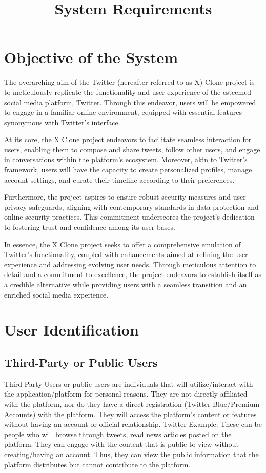 \documentclass{article}
\title{System Requirements}
\author{}
\date{}
\begin{document}
\maketitle

\section{Objective of the System}
The overarching aim of the Twitter (hereafter referred to as X) Clone project is to meticulously replicate the functionality and user experience of the esteemed social media platform, Twitter. Through this endeavor, users will be empowered to engage in a familiar online environment, equipped with essential features synonymous with Twitter’s interface.

At its core, the X Clone project endeavors to facilitate seamless interaction for users, enabling them to compose and share tweets, follow other users, and engage in conversations within the platform’s ecosystem. Moreover, akin to Twitter’s framework, users will have the capacity to create personalized profiles, manage account settings, and curate their timeline according to their preferences.

Furthermore, the project aspires to ensure robust security measures and user privacy safeguards, aligning with contemporary standards in data protection and online security practices. This commitment underscores the project’s dedication to fostering trust and confidence among its user bases.

In essence, the X Clone project seeks to offer a comprehensive emulation of Twitter’s functionality, coupled with enhancements aimed at refining the user experience and addressing evolving user needs. Through meticulous attention to detail and a commitment to excellence, the project endeavors to establish itself as a credible alternative while providing users with a seamless transition and an enriched social media experience.

\section{User Identification}
\subsection{Third-Party or Public Users}
Third-Party Users or public users are individuals that will utilize/interact with the application/platform for personal reasons. They are not directly affiliated with the platform, nor do they have a direct registration (Twitter Blue/Premium Accounts) with the platform. They will access the platform’s content or features without having an account or official relationship. Twitter Example: These can be people who will browse through tweets, read news articles posted on the platform. They can engage with the content that is public to view without creating/having an account. Thus, they can view the public information that the platform distributes but cannot contribute to the platform.
\end{document}
